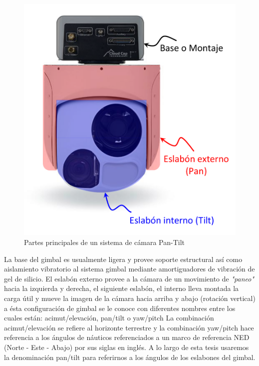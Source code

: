 \begin{figure}[H]
\centering \includegraphics[scale=0.4]{img/GimbalParts.pdf}
\caption{Partes principales de un sistema de c\'{a}mara Pan-Tilt}%
\label{fig:CamParts}
\end{figure}

La base del gimbal es usualmente ligera y provee soporte estructural as\'{i} como aislamiento vibratorio al sistema gimbal mediante amortiguadores de vibraci\'{o}n de gel de silicio. El eslab\'{o}n externo provee a la c\'{a}mara de un movimiento de \textit{"paneo"} hacia la izquierda y derecha, el siguiente eslab\'{o}n, el interno lleva montada la carga \'{u}til y mueve la imagen de la c\'{a}mara hacia arriba y abajo (rotaci\'{o}n vertical) a \'{e}sta configuraci\'{o}n de gimbal se le conoce con diferentes nombres entre los cuales est\'{a}n: acimut/elevaci\'{o}n, pan/tilt o yaw/pitch La combinaci\'{o}n acimut/elevaci\'{o}n se refiere al horizonte terrestre y la combinaci\'{o}n yaw/pitch hace referencia a los \'{a}ngulos de n\'{a}uticos referenciados a un marco de referencia NED (Norte - Este - Abajo) por sus siglas en ingl\'{e}s. A lo largo de esta tesis usaremos la denominaci\'{o}n pan/tilt para referirnos a los \'{a}ngulos de los eslabones del gimbal.

